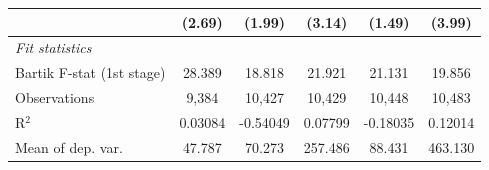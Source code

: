 \begin{tabular}{lccccc}
                                                                  & (2.69)                        & (1.99)                      & (3.14)                          & (1.49)                        & (3.99)\\   
   \midrule
   \emph{Fit statistics}\\
   Bartik F-stat (1st stage)                                  & 28.389                        & 18.818                      & 21.921                          & 21.131                        & 19.856\\  
   Observations                                                   & 9,384                         & 10,427                      & 10,429                          & 10,448                        & 10,483\\  
   R$^2$                                                          & 0.03084                       & -0.54049                    & 0.07799                         & -0.18035                      & 0.12014\\  
   Mean of dep. var.                                              & 47.787                        & 70.273                      & 257.486                         & 88.431                        & 463.130\\  
\bottomrule
\end{tabular}

